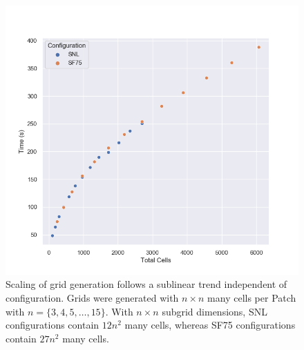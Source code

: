 \begin{figure}[H]
    \centering
    \includegraphics[width=\linewidth]{figures/benchmark/benchmark_grid_scaling.png}
    \caption{Scaling of grid generation follows a sublinear trend independent of configuration. Grids were generated with $n\times n$ many cells per Patch with $n = \{3, 4, 5, \dots, 15\}$. With $n \times n$ subgrid dimensions, SNL configurations contain $12n^2$ many cells, whereas SF75 configurations contain $27n^2$ many cells.}
    \label{fig:benchmark_grid_scaling}
\end{figure}

